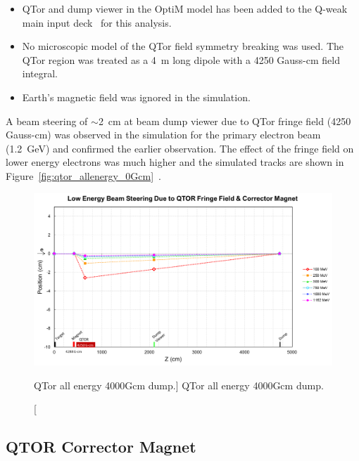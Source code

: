 \begin{itemize}
\doublespacing
\item QTor and dump viewer in the OptiM model has been added to the Q-weak main input deck~\cite{jay_communication} for this analysis.
\item No microscopic model of the QTor field symmetry breaking was used. The QTor region was treated as a 4~m long dipole with a 4250 Gauss-cm field integral.
\item Earth's magnetic field was ignored in the simulation.
\end{itemize}

A beam steering of $\sim$2~cm at beam dump viewer due to QTor fringe field (4250 Gauss-cm) was observed in the simulation for the primary electron beam (1.2~GeV) and confirmed the earlier observation. The effect of the fringe field on lower energy electrons was much higher and the simulated tracks are shown in Figure~\ref{fig:qtor_allenergy_0Gcm}~\cite{elog:nur_qtor4}. 

\begin{singlespace}
\begin{figure}[!h]
	\begin{center}
		\includegraphics[width=15.0cm]{figures/qtor_allenergy_4000Gcm_sacle_dump}
	\end{center}
	\caption
		[QTor all energy 4000Gcm dump.]
		{QTor all energy 4000Gcm dump.}
		\label{fig:qtor_allenergy_4000Gcm_sacle_dump}
\end{figure}
\end{singlespace}

\subsection{QTOR Corrector Magnet}
\label{QTOR Corrector Magnet}

